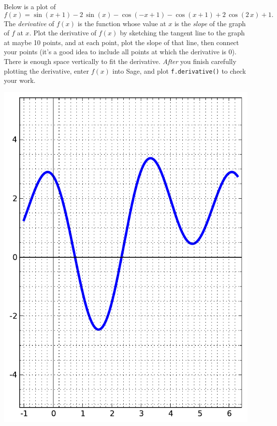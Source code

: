 Below is a plot of $$f(x)=\sin\left(x + 1\right) - 2 \, \sin\left(x\right) - \cos\left(-x + 1\right) - \cos\left(x + 1\right) + 2 \, \cos\left(2 \, x\right) + 1.$$  The {\em \color{red}derivative} of $f(x)$ is the function whose value at $x$ is the {\em slope} of the graph of $f$ at $x$.  Plot the derivative of $f(x)$ by sketching the tangent line to the graph at maybe 10 points, and at each point, plot the slope of that line, then connect your points (it's a good idea to include all points at which the derivative is 0).  There is enough space vertically to fit the derivative.  {\em After} you finish carefully plotting the derivative, enter $f(x)$ into Sage, and plot {\color{blue}\verb|f.derivative()|} to check your work.
\begin{center}\includegraphics{functions/69.pdf}\end{center}\newpage

